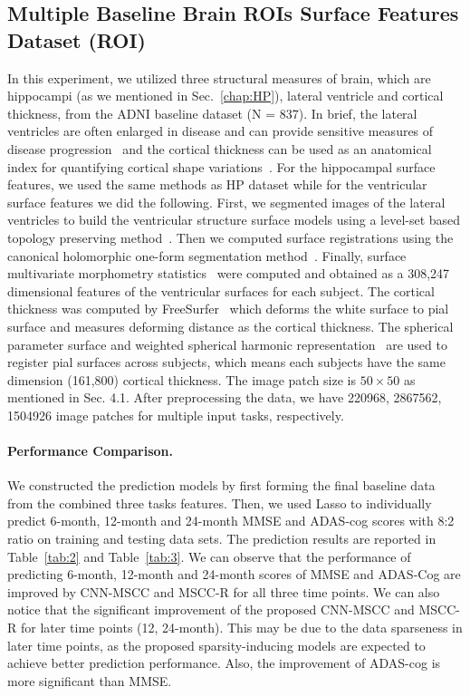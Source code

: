 \documentclass[10pt,twocolumn,letterpaper]{article}
\begin{document}
\subsection{Multiple Baseline Brain ROIs Surface Features Dataset (ROI)}
In this experiment, we utilized three structural measures of brain, which are hippocampi (as we mentioned in Sec.~\ref{chap:HP}), lateral ventricle and cortical thickness, from the ADNI baseline dataset (N = 837). In brief, the lateral ventricles are often enlarged in disease and can provide sensitive measures of disease progression~\cite{thompson2004mapping} and the cortical thickness can be used as an anatomical index for quantifying cortical shape variations~\cite{chung2005unified}. For the hippocampal surface features, we used the same methods as HP dataset while for the ventricular surface features we did the following. First, we segmented images of the lateral ventricles to build the ventricular structure surface models using a level-set based topology preserving method~\cite{han2003topology}. Then we computed surface registrations using the canonical holomorphic one-form segmentation method~\cite{wang2009multivariate}. Finally, surface multivariate morphometry statistics~\cite{wang2011surface} were computed and obtained as a 308,247 dimensional features of the ventricular surfaces for each subject. The cortical thickness was computed by FreeSurfer~\cite{fischl2012freesurfer} which deforms the white surface to pial surface and measures deforming distance as the cortical thickness. The spherical parameter surface and weighted spherical harmonic representation~\cite{Chung:tmi08}\cite{zhang2017empowering} are used to register pial surfaces across subjects, which means each subjects have the same dimension (161,800) cortical thickness. The image patch size is $50\times 50$ as mentioned in Sec. 4.1. After preprocessing the data, we have 220968, 2867562, 1504926 image patches for multiple input tasks, respectively.

\paragraph{Performance Comparison.}
We constructed the prediction models by first forming the final baseline data from the combined three tasks features. Then, we used Lasso to individually predict 6-month, 12-month and 24-month MMSE and ADAS-cog scores with 8:2 ratio on training and testing data sets. The prediction results are reported in Table~\ref{tab:2} and Table~\ref{tab:3}. We can observe that the performance of predicting 6-month, 12-month and 24-month scores of MMSE and ADAS-Cog are improved by CNN-MSCC and MSCC-R for all three time points. We can also notice that the significant improvement of the proposed CNN-MSCC and MSCC-R for later time points (12, 24-month). This may be due to the data sparseness in later time points, as the proposed sparsity-inducing models are expected to achieve better prediction performance. Also, the improvement of ADAS-cog is more significant than MMSE.
\end{document}
